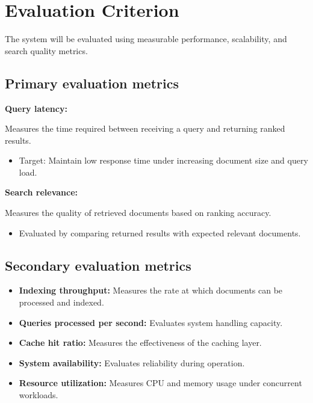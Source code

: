 \documentclass[11pt]{article}
\begin{document}
\section{Evaluation Criterion}

The system will be evaluated using measurable performance, scalability, and search quality metrics.

\subsection{Primary evaluation metrics}

\textbf{Query latency:}

Measures the time required between receiving a query and returning ranked results.

\begin{itemize}
\item Target: Maintain low response time under increasing document size and query load.
\end{itemize}


\textbf{Search relevance:}

Measures the quality of retrieved documents based on ranking accuracy.

\begin{itemize}
\item Evaluated by comparing returned results with expected relevant documents.
\end{itemize}


\subsection{Secondary evaluation metrics}

\begin{itemize}

\item \textbf{Indexing throughput:} Measures the rate at which documents can be processed and indexed.

\item \textbf{Queries processed per second:} Evaluates system handling capacity.

\item \textbf{Cache hit ratio:} Measures the effectiveness of the caching layer.

\item \textbf{System availability:} Evaluates reliability during operation.

\item \textbf{Resource utilization:} Measures CPU and memory usage under concurrent workloads.

\end{itemize}
\end{document}
